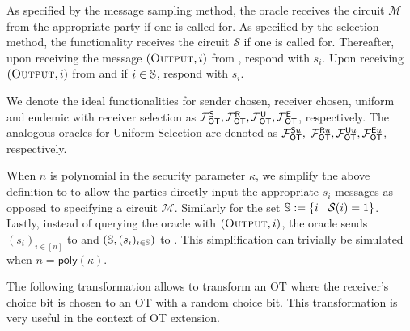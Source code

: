 \begin{definition}
	As specified by the message sampling method, the oracle receives the circuit $\mathcal{M}$ from the appropriate party if one is called for.  As specified by the selection method, the functionality receives the circuit $\mathcal{S}$ if one is called for. 
	Thereafter, upon receiving the message $(\textsc{Output}, i)$ from \send, respond with $s_i$. Upon receiving $(\textsc{Output}, i)$ from \rec and if $i\in \mathsf{\mathbb S}$,  respond with $s_i$. 
	
	We denote the ideal functionalities for sender chosen, receiver chosen, uniform and endemic with receiver selection as $\mathcal{F}_{\mathsf{OT}}^\mathsf{S}, \mathcal{F}_{\mathsf{OT}}^\mathsf{R},\mathcal{F}_{\mathsf{OT}}^\mathsf{U},\mathcal{F}_{\mathsf{OT}}^\mathsf{E}$, respectively. The analogous oracles for Uniform Selection are denoted as  $\mathcal{F}_{\mathsf{OT}}^{\mathsf{S} u},$ $\mathcal{F}_{\mathsf{OT}}^{\mathsf{R} u}, \mathcal{F}_{\mathsf{OT}}^{\mathsf{U} u}, \mathcal{F}_{\mathsf{OT}}^{\mathsf{E} u}$, respectively.
\end{definition}
\begin{remark}
	When $n$ is polynomial in the security parameter $\kappa$, we simplify the above definition to  to allow the parties directly input the appropriate $s_i$ messages as opposed to specifying a circuit $\mathcal{M}$. Similarly for the set $\mathsf{\mathbb S}:=\{i \mid \mathcal{S}(i)=1\}$. Lastly, instead of querying the oracle with $(\textsc{Output}, i)$, the oracle sends $(s_i)_{i\in [n]}$ to \send and $(\mathsf{\mathbb S}, (s_i)_{i\in\mathsf{\mathbb S}})$ to \rec. This simplification can trivially be simulated when $n=\textsf{poly}(\kappa)$.
\end{remark}


The following transformation allows to transform an OT where the receiver's choice bit is chosen to an OT with a random choice bit. This transformation is very useful in the context of OT extension.

